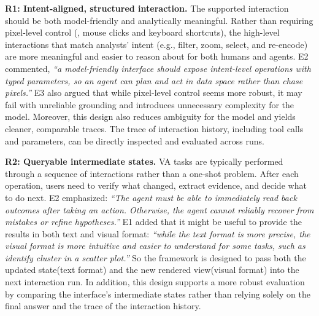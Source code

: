 \textbf{R1: Intent-aligned, structured interaction.}
The supported interaction should be both model-friendly and analytically meaningful.
Rather than requiring pixel-level control (\eg, mouse clicks and keyboard shortcuts), the high-level interactions that match analysts' intent (e.g., filter, zoom, select, and re-encode) are more meaningful and easier to reason about for both humans and agents.
E2 commented, \textit{``a model-friendly interface should expose intent-level operations with typed parameters, so an agent can plan and act in data space rather than chase pixels.''}
E3 also argued that while pixel-level control seems more robust, it may fail with unreliable grounding and introduces unnecessary complexity for the model.
Moreover, this design also reduces ambiguity for the model and yields cleaner, comparable traces.
The trace of interaction history, including tool calls and parameters, can be directly inspected and evaluated across runs.

\textbf{R2: Queryable intermediate states.}
VA tasks are typically performed through a sequence of interactions rather than a one-shot problem.
After each operation, users need to verify what changed, extract evidence, and decide what to do next.
E2 emphasized: \textit{``The agent must be able to immediately read back outcomes after taking an action. Otherwise, the agent cannot reliably recover from mistakes or refine hypotheses.''}
E1 added that it might be useful to provide the results in both text and visual format: 
\textit{``while the text format is more precise, the visual format is more intuitive and easier to understand for some tasks, such as identify cluster in a scatter plot.''}
So the framework is designed to pass both the updated state(text format) and the new rendered view(visual format) into the next interaction run.
In addition, this design supports a more robust evaluation by comparing the interface's intermediate states rather than relying solely on the final answer and the trace of the interaction history.



